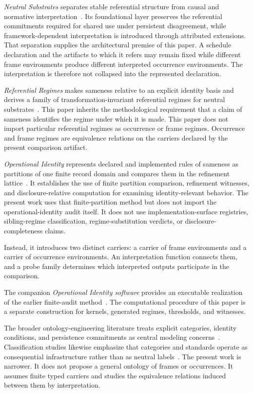 \documentclass[11pt]{article}
\theoremstyle{plain}
\theoremstyle{definition}
\theoremstyle{remark}
\begin{document}
\emph{Neutral Substrates} separates stable referential structure
from causal and normative interpretation~\citep{case2026neutral}.
Its foundational layer preserves the referential commitments required
for shared use under persistent disagreement,
while framework-dependent interpretation
is introduced through attributed extensions.
That separation supplies the architectural premise of this paper.
A schedule declaration and the artifacts to which it refers
may remain fixed while different frame environments
produce different interpreted occurrence environments.
The interpretation is therefore not collapsed
into the represented declaration.

\emph{Referential Regimes} makes sameness relative
to an explicit identity basis and derives a family of transformation-invariant
referential regimes for neutral substrates~\citep{case2026referential}.
This paper inherits the methodological requirement
that a claim of sameness identifies the regime under which it is made.
This paper does not import particular referential regimes as occurrence or frame regimes.
Occurrence and frame regimes are equivalence relations
on the carriers declared by the present comparison artifact.

\emph{Operational Identity} represents declared and implemented rules of sameness
as partitions of one finite record domain and compares them
in the refinement lattice~\citep{case2026operational}.
It establishes the use of finite partition comparison,
refinement witnesses, and disclosure-relative computation
for examining identity-relevant behavior.
The present work uses that finite-partition method
but does not import the operational-identity audit itself.
It does not use implementation-surface registries,
sibling-regime classification,
regime-substitution verdicts,
or disclosure-completeness claims.

Instead, it introduces two distinct carriers:
a carrier of frame environments
and a carrier of occurrence environments.
An interpretation function connects them,
and a probe family determines
which interpreted outputs participate in the comparison.

The companion \emph{Operational Identity software}
provides an executable realization
of the earlier finite-audit method~\citep{case2026oiverification}.
The computational procedure of this paper
is a separate construction for kernels, generated regimes, thresholds, and witnesses.

The broader ontology-engineering literature treats explicit categories,
identity conditions, and persistence commitments
as central modeling concerns~\citep{arp2015building}.
Classification studies likewise emphasize that categories and standards
operate as consequential infrastructure
rather than as neutral labels~\citep{bowkerstar1999}.
The present work is narrower.
It does not propose a general ontology of frames or occurrences.
It assumes finite typed carriers and studies the equivalence relations
induced between them by interpretation.
\end{document}
